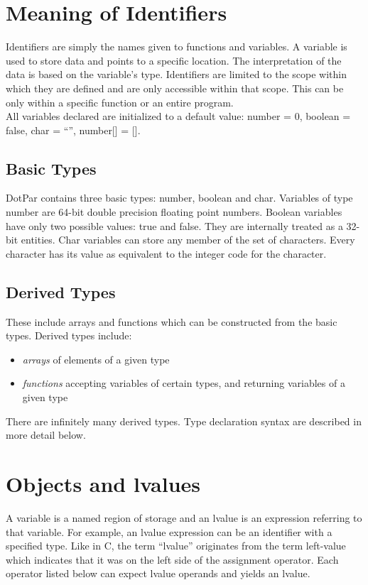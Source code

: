 \section{Meaning of Identifiers}
Identifiers are simply the names given to functions and variables. A variable is used to store data and points to a specific location. The interpretation of the data is based on the variable's type. Identifiers are limited to the scope within which they are defined and are only accessible within that scope. This can be only within a specific function or an entire program.
\\All variables declared are initialized to a default value: number = 0, boolean = false, char = ``'', number[] = [].
\subsection{Basic Types}
DotPar contains three basic types: number, boolean and char. Variables of type number are 64-bit double precision floating point numbers. Boolean variables have only two possible values: true and false. They are internally treated as a 32-bit entities. Char variables can store any member of the set of characters. Every character has its value as equivalent to the integer code for the character.
\subsection{Derived Types}
These include arrays and functions which can be constructed from the basic types. Derived types include:
\begin{itemize}
\item
\emph{arrays} of elements of a given type
\item
\emph{functions} accepting variables of certain types, and returning variables of a given type
\end{itemize}
There are infinitely many derived types. Type declaration syntax are described in more detail below.

\section{Objects and lvalues}
A variable is a named region of storage and an lvalue is an expression referring to that variable. For example, an lvalue expression can be an identifier with a specified type. Like in C, the term ``lvalue'' originates from the term left-value which indicates that it was on the left side of the assignment operator. Each operator listed below can expect lvalue operands and yields an lvalue.

